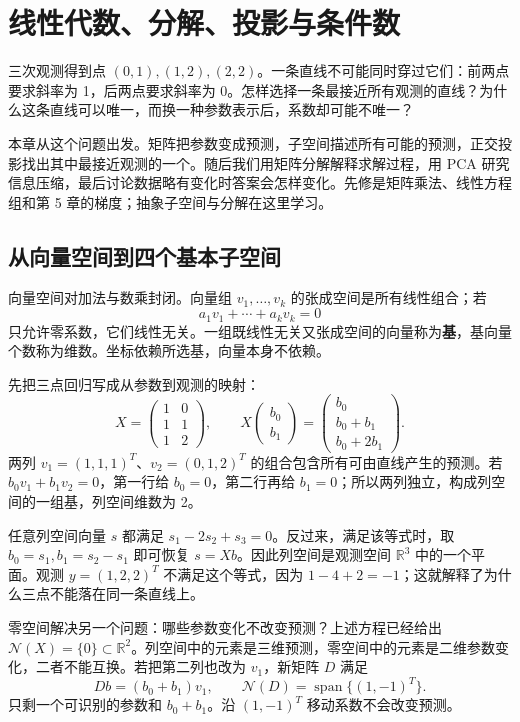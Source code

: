 \chapter{线性代数、分解、投影与条件数}
\label{ch:linear-algebra}


三次观测得到点 $(0,1),(1,2),(2,2)$。一条直线不可能同时穿过它们：前两点要求斜率为 1，后两点要求斜率为 0。怎样选择一条最接近所有观测的直线？为什么这条直线可以唯一，而换一种参数表示后，系数却可能不唯一？

本章从这个问题出发。矩阵把参数变成预测，子空间描述所有可能的预测，正交投影找出其中最接近观测的一个。随后我们用矩阵分解解释求解过程，用 PCA 研究信息压缩，最后讨论数据略有变化时答案会怎样变化。先修是矩阵乘法、线性方程组和第 5 章的梯度；抽象子空间与分解在这里学习。

\section{从向量空间到四个基本子空间}

向量空间对加法与数乘封闭。向量组 $v_1,\ldots,v_k$ 的张成空间是所有线性组合；若
\[
  a_1v_1+\cdots+a_kv_k=0
\]
只允许零系数，它们线性无关。一组既线性无关又张成空间的向量称为\textbf{基}，基向量个数称为维数。坐标依赖所选基，向量本身不依赖。

先把三点回归写成从参数到观测的映射：
\[
 X=\begin{pmatrix}1&0\\1&1\\1&2\end{pmatrix},\qquad
 X\begin{pmatrix}b_0\\b_1\end{pmatrix}
 =\begin{pmatrix}b_0\\b_0+b_1\\b_0+2b_1\end{pmatrix}.
\]
两列 $v_1=(1,1,1)^T$、$v_2=(0,1,2)^T$ 的组合包含所有可由直线产生的预测。若 $b_0v_1+b_1v_2=0$，第一行给 $b_0=0$，第二行再给 $b_1=0$；所以两列独立，构成列空间的一组基，列空间维数为 2。

任意列空间向量 $s$ 都满足 $s_1-2s_2+s_3=0$。反过来，满足该等式时，取 $b_0=s_1,b_1=s_2-s_1$ 即可恢复 $s=Xb$。因此列空间是观测空间 $\mathbb R^3$ 中的一个平面。观测 $y=(1,2,2)^T$ 不满足这个等式，因为 $1-4+2=-1$；这就解释了为什么三点不能落在同一条直线上。

零空间解决另一个问题：哪些参数变化不改变预测？上述方程已经给出 $\mathcal N(X)=\{0\}\subset\mathbb R^2$。列空间中的元素是三维预测，零空间中的元素是二维参数变化，二者不能互换。若把第二列也改为 $v_1$，新矩阵 $D$ 满足
\[
 Db=(b_0+b_1)v_1,\qquad
 \mathcal N(D)=\operatorname{span}\{(1,-1)^T\}.
\]
只剩一个可识别的参数和 $b_0+b_1$。沿 $(1,-1)^T$ 移动系数不会改变预测。

